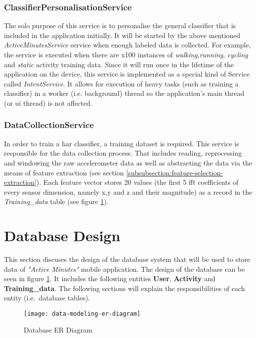             \subsubsection{ClassifierPersonalisationService}
            The solo purpose of this service is to personalise the general classifier that is included in the application initially. It will be started by the above mentioned \textit{ActiveMinutesService} service when enough labeled data is collected. For example, the service is executed when there are x100 instances of \textit{walking},\textit{running}, \textit{cycling} and \textit{static} activity training data. Since it will run once in the lifetime of the application on the device, this service is implemented as a special kind of Service called \textit{IntentService}. It allows for execution of heavy tasks (such as training a classifier) in a worker (i.e. background) thread so the application's main thread (or \gls{ui} thread) is not affected.
            
            \subsubsection{DataCollectionService}
            In order to train a \gls{har} classifier, a training dataset is required. This service is responsible for the data collection process. That includes reading, reprocessing and windowing the raw accelerometer data as well as abstracting the data via the means of feature extraction (see section \ref{subsubsection:feature-selection-extraction}). Each feature vector stores 20 values (the first 5 \gls{fft} coefficients of every sensor dimension, namely x,y and z and their magnitude) as a record in the \textit{Training\_data} table (see figure \ref{fig:data_modeling_er_diagram}).
    
    \section{Database Design}
    This section discuses the design of the database system that will be used to store data of \textit{"Active Minutes"} mobile application. The design of the database can be seen in figure \ref{fig:data_modeling_er_diagram}. It includes the following entities \textbf{User}, \textbf{Activity} and \textbf{Training\_data}. The following sections will explain the responsibilities of each entity (i.e.\ database tables).
        
        \begin{figure}[ht]
            \centering
            \texttt{[image: data-modeling-er-diagram]}
            \caption{Database ER Diagram}
            \label{fig:data_modeling_er_diagram}
        \end{figure}
        

